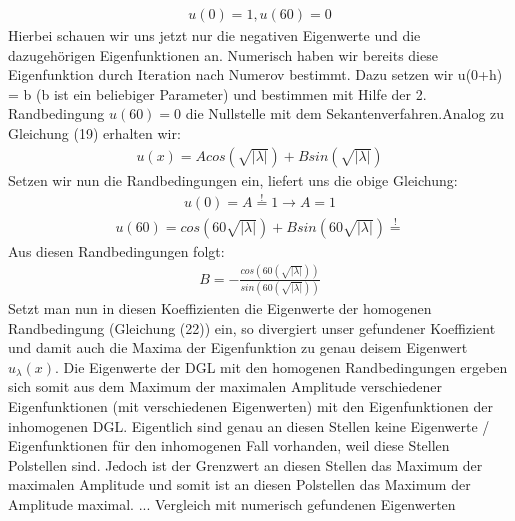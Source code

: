\documentclass[ngerman]{scrartcl}
\begin{document}
\begin{align}
u(0) = 1, u(60) = 0
\end{align}
Hierbei schauen wir uns jetzt nur die negativen Eigenwerte und die dazugehörigen Eigenfunktionen an. Numerisch haben wir bereits diese Eigenfunktion durch Iteration nach Numerov bestimmt. Dazu setzen wir u(0+h) = b (b ist ein beliebiger Parameter) und bestimmen mit Hilfe der 2. Randbedingung $u(60) = 0$ die Nullstelle mit dem Sekantenverfahren.\newline Analog zu Gleichung (19) erhalten wir:
\begin{align}
u(x) = A cos(\sqrt{|\lambda|}) + B sin(\sqrt{|\lambda|})
\end{align}
Setzen wir nun die Randbedingungen ein, liefert uns die obige Gleichung:
\begin{align}
u(0) = A \overset{!}{=} 1 \rightarrow A = 1
\end{align}
\begin{align}
u(60) = cos(60 \sqrt{|\lambda|}) + B sin (60 \sqrt{|\lambda|}) \overset{!}{=}
\end{align}
Aus diesen Randbedingungen folgt:
\begin{align}
B = - \frac{cos(60 (\sqrt{|\lambda|}))}{sin(60 (\sqrt{|\lambda|}))}
\end{align}
Setzt man nun in diesen Koeffizienten die Eigenwerte der homogenen Randbedingung (Gleichung (22))  ein, so divergiert unser gefundener Koeffizient und damit auch die Maxima der Eigenfunktion zu genau deisem Eigenwert $u_{\lambda}(x)$.
\newline
Die Eigenwerte der DGL mit den homogenen Randbedingungen ergeben sich somit aus dem Maximum der maximalen Amplitude verschiedener Eigenfunktionen (mit verschiedenen Eigenwerten) mit den Eigenfunktionen der inhomogenen DGL. \newline
Eigentlich sind genau an diesen Stellen keine Eigenwerte / Eigenfunktionen für den inhomogenen Fall vorhanden, weil diese Stellen Polstellen sind. Jedoch ist der Grenzwert an diesen Stellen das Maximum der maximalen Amplitude und somit ist an diesen Polstellen das Maximum der Amplitude maximal.\newline
... Vergleich mit numerisch gefundenen Eigenwerten
\newpage
\end{document}
